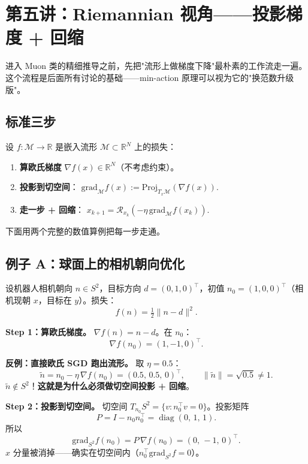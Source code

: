 \documentclass[11pt,a4paper]{article}
\theoremstyle{mythm}
\theoremstyle{mydef}
\newcommand{\R}{\mathbb{R}}
\newcommand{\diag}{\operatorname{diag}}
\begin{document}
\section{第五讲：Riemannian 视角——投影梯度 + 回缩}\label{sec:riemann-baseline}

进入 Muon 类的精细推导之前，先把"流形上做梯度下降"最朴素的工作流走一遍。这个流程是后面所有讨论的基础——min-action 原理可以视为它的"换范数升级版"。

\subsection{标准三步}

设 $f: \mathcal{M} \to \R$ 是嵌入流形 $\mathcal{M} \subset \R^N$ 上的损失：
\begin{enumerate}[leftmargin=2em]
\item \textbf{算欧氏梯度} $\nabla f(x) \in \R^N$（不考虑约束）。
\item \textbf{投影到切空间}：
$\mathrm{grad}_\mathcal{M} f(x) := \mathrm{Proj}_{T_x\mathcal{M}}(\nabla f(x)).$
\item \textbf{走一步 + 回缩}：
$x_{k+1} = \mathcal{R}_{x_k}(-\eta\,\mathrm{grad}_\mathcal{M} f(x_k)).$
\end{enumerate}

下面用两个完整的数值算例把每一步走通。

\subsection{例子 A：球面上的相机朝向优化}\label{sec:sphere-camera}

设机器人相机朝向 $n \in S^2$，目标方向 $d = (0, 1, 0)^\top$，初值 $n_0 = (1, 0, 0)^\top$（相机现朝 $x$，目标在 $y$）。损失：
$$f(n) = \tfrac{1}{2}\|n - d\|^2.$$

\textbf{Step 1：算欧氏梯度。}
$\nabla f(n) = n - d$。在 $n_0$：
$$\nabla f(n_0) = (1, -1, 0)^\top.$$

\textbf{反例：直接欧氏 SGD 跑出流形。}
取 $\eta = 0.5$：
$$\tilde n = n_0 - \eta\,\nabla f(n_0) = (0.5,\,0.5,\,0)^\top,\qquad \|\tilde n\| = \sqrt{0.5} \ne 1.$$
$\tilde n \notin S^2$！\textbf{这就是为什么必须做切空间投影 + 回缩}。

\textbf{Step 2：投影到切空间。}
切空间 $T_{n_0} S^2 = \{v: n_0^\top v = 0\}$。投影矩阵
$$P = I - n_0 n_0^\top = \diag(0,\,1,\,1).$$
所以
$$\mathrm{grad}_{S^2} f(n_0) = P\,\nabla f(n_0) = (0,\,-1,\,0)^\top.$$
$x$ 分量被消掉——确实在切空间内（$n_0^\top \mathrm{grad}_{S^2} f = 0$）。
\end{document}
